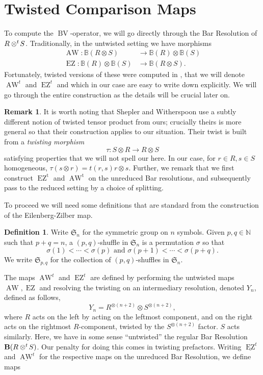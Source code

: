 \documentclass{article}
\newcommand{\ten}{\otimes}
\newcommand{\twisten}{\otimes^t\hspace{-1pt}}
\newcommand{\bv}{\operatorname{BV}}
\newcommand{\awt}{\operatorname{AW}^t}
\newcommand{\ezt}{\operatorname{EZ}^t}
\newcommand{\bezt}{\underline{\operatorname{EZ}}^t}
\newcommand{\bawt}{\underline{\operatorname{AW}}^t}
\theoremstyle{plain}
\theoremstyle{definition}
\newtheorem{remark}[theorem]{Remark}
\newtheorem{defn}[theorem]{Definition}
\begin{document}
\section{Twisted Comparison Maps}
To compute the $\bv$-operator, we will go directly through the Bar Resolution of $R \twisten S$. Traditionally, in the untwisted setting we have morphisms
$$\begin{aligned} \operatorname{AW}:  \mathbb{B}(R \otimes S)  &\rightarrow \mathbb{B}(R) \ten \mathbb{B}(S)\\
\operatorname{EZ}: \mathbb{B}(R) \ten \mathbb{B}(S) &\rightarrow \mathbb{B}(R \otimes S).
\end{aligned}$$
Fortunately, twisted versions of these were computed in \cite{Shepler}, that we will denote $\awt$ and $\ezt$ and which in our case are easy to write down explicitly. We will go through the entire construction as the details will be crucial later on.
\begin{remark} 
It is worth noting that Shepler and Witherspoon use a subtly different notion of twisted tensor product from ours; crucially theirs is more general so that their construction applies to our situation. Their twist is built from a \emph{twisting morphism} 
$$\tau: S \otimes R \rightarrow R \otimes S$$
satisfying properties that we will not spell our here. In our case, for $r \in R ,s \in S$ homogeneous, $\tau(s \otimes r) = t(r,s)r \otimes s$.
Further, we remark that we first construct $\operatorname{\ezt}$ and $\operatorname{\awt}$ on the unreduced Bar resolutions, and subsequently pass to the reduced setting by a choice of splitting. 
\end{remark}
To proceed we will need some definitions that are standard from the construction of the Eilenberg-Zilber map.
\begin{defn} Write $\mathfrak{S}_n$ for the symmetric group on $n$ symbols. Given $p,q \in \mathbb{N}$ such that $p+q=n$, a $(p,q)$-shuffle in $\mathfrak{S}_n$ is a permutation $\sigma$ so that
$$\sigma(1) <  \cdots < \sigma(p) \textrm{ and } \sigma(p+1) < \cdots < \sigma(p+q).$$
We write $\mathfrak{S}_{p,q}$ for the collection of $(p,q)$-shuffles in $\mathfrak{S}_n$. 
\end{defn}
The maps $\awt$ and $\ezt$ are defined by performing the untwisted maps $\operatorname{AW}, \operatorname{EZ}$ and resolving the twisting on an intermediary resolution, denoted $Y_n$, defined as follows,
$$Y_n = R^{\otimes (n+2)} \otimes S^{\otimes (n+2)},$$
where $R$ acts on the left by acting on the leftmost component, and on the right acts on the rightmost $R$-component, twisted by the $S^{\otimes (n+2)}$ factor. $S$ acts similarly. Here, we have in some sense ``untwisted'' the regular Bar Resolution $\mathbf{B}(R \twisten S)$. Our penalty for doing this comes in twisting prefactors. Writing $\bezt$ and $\bawt$ for the respective maps on the unreduced Bar Resolution, we define maps
\end{document}
